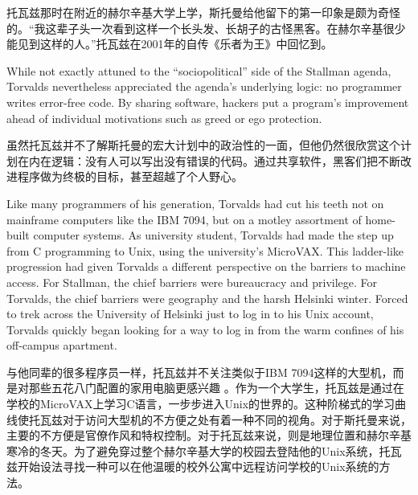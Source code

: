 \ifdefined\chs
托瓦兹那时在附近的赫尔辛基大学上学，斯托曼给他留下的第一印象是颇为奇怪的。``我这辈子头一次看到这样一个长头发、长胡子的古怪黑客。在赫尔辛基很少能见到这样的人。''托瓦兹在2001年的自传《乐者为王》中回忆到。
\fi

\ifdefined\eng
While not exactly attuned to the ``sociopolitical'' side of the Stallman agenda, Torvalds nevertheless appreciated the agenda's underlying logic: no programmer writes error-free code. By sharing software, hackers put a program's improvement ahead of individual motivations such as greed or ego protection.
\fi

\ifdefined\chs
虽然托瓦兹并不了解斯托曼的宏大计划中的政治性的一面，但他仍然很欣赏这个计划在内在逻辑：没有人可以写出没有错误的代码。通过共享软件，黑客们把不断改进程序做为终极的目标，甚至超越了个人野心。
\fi

\ifdefined\eng
Like many programmers of his generation, Torvalds had cut his teeth not on mainframe computers like the IBM 7094, but on a motley assortment of home-built computer systems. As university student, Torvalds had made the step up from C programming to Unix, using the university's MicroVAX. This ladder-like progression had given Torvalds a different perspective on the barriers to machine access. For Stallman, the chief barriers were bureaucracy and privilege. For Torvalds, the chief barriers were geography and the harsh Helsinki winter. Forced to trek across the University of Helsinki just to log in to his Unix account, Torvalds quickly began looking for a way to log in from the warm confines of his off-campus apartment.
\fi

\ifdefined\chs
与他同辈的很多程序员一样，托瓦兹并不关注类似于IBM 7094这样的大型机，而是对那些五花八门配置的家用电脑更感兴趣 。作为一个大学生，托瓦兹是通过在学校的MicroVAX上学习C语言，一步步进入Unix的世界的。这种阶梯式的学习曲线使托瓦兹对于访问大型机的不方便之处有着一种不同的视角。对于斯托曼来说，主要的不方便是官僚作风和特权控制。对于托瓦兹来说，则是地理位置和赫尔辛基寒冷的冬天。为了避免穿过整个赫尔辛基大学的校园去登陆他的Unix系统，托瓦兹开始设法寻找一种可以在他温暖的校外公寓中远程访问学校的Unix系统的方法。
\fi


